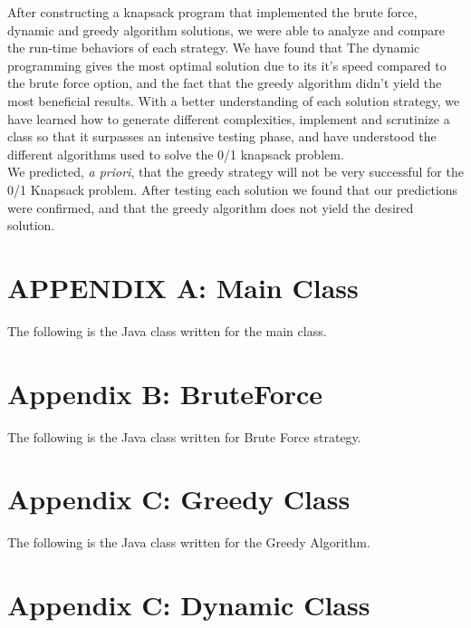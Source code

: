 \documentclass[12pt]{article}
\begin{document}
    After constructing a knapsack program that implemented the brute force, dynamic and greedy algorithm solutions, we were able to analyze and compare the run-time behaviors of each strategy. We have found that The dynamic programming gives the most optimal solution due to its it's speed compared to the brute force option, and the fact that the greedy algorithm didn't yield the most beneficial results. With a better understanding of each solution strategy, we have learned how to generate different complexities, implement and scrutinize a class so that it surpasses an intensive testing phase, and have understood the different algorithms used to solve the 0/1 knapsack problem. \\
    
    We predicted, \textit{a priori}, that the greedy strategy will not be very successful for the 0/1 Knapsack problem.  After testing each solution we found that our predictions were confirmed, and that the greedy algorithm does not yield the desired solution.
	\pagebreak
	
	\section*{APPENDIX A: Main Class}
	The following is the Java class written for the main class. 
	
	\hrulefill 
	
	\pagebreak
	
	\section*{Appendix B: BruteForce }
	
	The following is the Java class written for Brute Force strategy.
    
	\hrulefill 
	
	\pagebreak
	
	\section*{Appendix C: Greedy Class}
	
	The following is the Java class written for the Greedy Algorithm.
	
	\hrulefill 
 	
	\pagebreak
	
	\section*{Appendix C: Dynamic Class}
	
\end{document}
